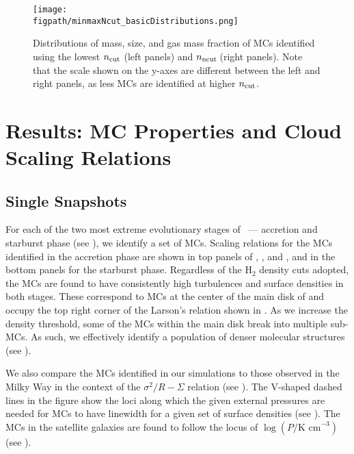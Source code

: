 \IfFileExists{emulateapjlegacy.cls}{\documentclass[iop]{emulateapjlegacy}}{\documentclass[iop]{emulateapj}}
\begin{document}
\begin{figure*}[htbp]
\centering
\texttt{[image: \\figpath/minmaxNcut\_basicDistributions.png]}
\caption{
Distributions of mass, size, and gas mass fraction of MCs identified using
the lowest $n_{\rm cut}$ (left panels) and $n_{\rm ncut}$\,\cc (right panels).
Note that the scale shown on the y-axes are different between the left and right panels, as less MCs are identified
at higher $n_{\rm cut}$.
\label{fig:dist}}
\end{figure*}



\section{Results: MC Properties and Cloud Scaling Relations}    \label{sec:results}
\subsection{Single Snapshots}  \label{sec:singless}

For each of the two most extreme evolutionary stages of \flower\ --- accretion and starburst phase (see ),
we identify a set of MCs. 
Scaling relations for the MCs identified in the accretion phase are shown in top panels 
of , , and , and in the bottom panels for the starburst phase.
Regardless of the H$_2$ density cuts adopted,
the MCs are found to have consistently high turbulences and surface densities in both stages.
These correspond to MCs at the center of the main disk of \flower and
occupy the top right corner of the Larson's relation shown in .
As we increase the density threshold, some of the MCs within the main disk break
into multiple sub-MCs.
As such, we effectively identify a population of denser molecular structures (see ).

We also compare the MCs identified in our simulations to
those observed in the Milky Way in the context of the $\sigma^2/R - \Sigma$ relation (see ). 
The V-shaped dashed lines in the figure show the loci along which the given external pressures are needed for
MCs to have linewidth for a given set of surface densities (see ).
The MCs in the satellite galaxies are found to follow the locus of $\log{(P/\textrm{K cm}^{-3})}$ (see ).
\end{document}
